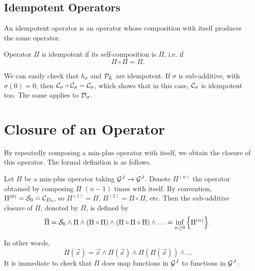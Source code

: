 \subsection{Idempotent Operators}


An idempotent operator is an operator whose composition with itself produces the same operator.

\begin{definition}
Operator $\Pi$ is idempotent if its self-composition is $\Pi$, i.e. if
$$ \Pi \circ \Pi = \Pi .$$
\end{definition}

We can easily check that $h_{\sigma}$ and $\mathcal P_L$ are
idempotent. If $\sigma$ is sub-additive, with $\sigma(0) = 0$,
then $\mathcal C_{\sigma} \circ \mathcal C_{\sigma} = \mathcal C_{\sigma}$, which
shows that in this case,
 $\mathcal C_{\sigma}$ is idempotent too. The same applies to $\mathcal D_{\sigma}$.



\section{Closure of an Operator}

By repeatedly composing a min-plus operator with itself, we obtain the closure of this operator.
The formal definition is as follows.
\begin{definition}
Let $\Pi$ be a min-plus operator taking $\mathcal G^J \rightarrow \mathcal G^J$. Denote $\Pi^{(n)}$ the operator obtained
by composing $\Pi$ $(n-1)$ times with itself. By convention, $\Pi^{(0)} = \mathcal S_0 = \mathcal C_{D_0}$,
so $\Pi^{(1)} = \Pi$, $\Pi^{(2)} = \Pi \circ \Pi$, etc.
Then the sub-additive closure of $\Pi$,  denoted by $\overline{\Pi}$, is defined by
\begin{equation}
\mylabel{eq:operatorclosure}
\overline{\Pi} = \calS_0 \wedge \Pi \wedge (\Pi \circ \Pi) \wedge (\Pi \circ \Pi \circ \Pi) \wedge \ldots = \inf_{n \geq 0} \left\{ \Pi^{(n)} \right\}.
\end{equation}
\end{definition}

In other words, $$ \overline{\Pi}(\vec{x}) = \vec{x} \wedge  \Pi(
\vec{x}) \wedge  \Pi( \Pi ( \vec{x}) ) \wedge \ldots $$ It is
immediate to check that $\overline{\Pi}$ does map functions in
$\mathcal G^J$ to functions in $\mathcal G^J$.

